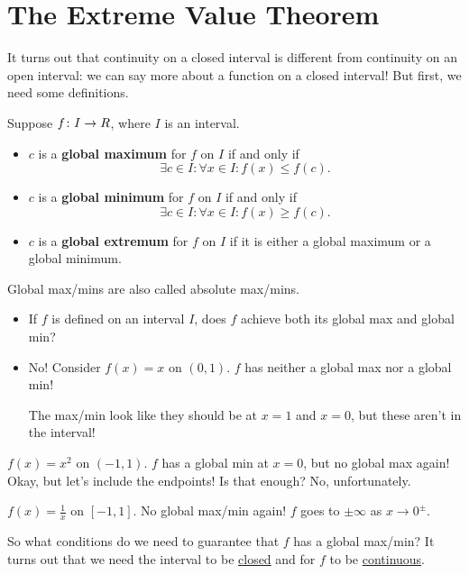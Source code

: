 \section{The Extreme Value Theorem}
It turns out that continuity on a closed interval is different from continuity
on an open interval: we can say more about a function on a closed interval!
But first, we need some definitions.
\begin{Definition}{}{}
    Suppose $ f\colon I\to \relax{R} $, where $ I $ is an interval.
    \begin{itemize}
        \item $ c $ is a \textbf{global maximum} for $ f $ on $ I $
              if and only if
              \[ \exists c\in I:\forall x\in I:f(x)\le f(c). \]
        \item $ c $ is a \textbf{global minimum} for $ f $ on $ I $
              if and only if
              \[ \exists c\in I:\forall x\in I:f(x)\ge f(c). \]
        \item $ c $ is a \textbf{global extremum} for $ f $ on $ I $
              if it is either a global maximum or a global minimum.
    \end{itemize}
\end{Definition}
\begin{Remark}{}{}
    Global max/mins are also called absolute max/mins.
\end{Remark}
\begin{itemize}
    \item If $ f $ is defined on an interval $ I $, does $ f $
          achieve both its global max and global min?
    \item No! Consider $ f(x)=x $ on $ (0,1) $. $ f $
          has neither a global max nor a global min!

          The max/min look like they should be at $ x=1 $ and $ x=0 $, but these aren't in the interval!
\end{itemize}
\begin{Example}{}{}
    $ f(x)=x^2 $ on $ (-1,1) $. $ f $ has a global min at $ x=0 $, but no global max again!
    Okay, but let's include the endpoints! Is that enough? No, unfortunately.
\end{Example}
\begin{Example}{}{}
    $ f(x)=\frac{1}{x} $ on $ [-1,1] $. No global max/min again!
    $ f $ goes to $ \pm\infty $ as $ x\to 0^{\pm} $.
\end{Example}
So what conditions do we need to guarantee that $ f $ has a global max/min?
It turns out that we need the interval to be \underline{closed}
and for $ f $ to be \underline{continuous}.


